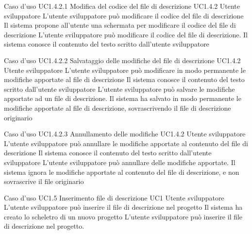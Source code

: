 \UCtitle
{Caso d'uso UC1.4.2.1}
{Modifica del codice del file di descrizione}
\UC
{UC1.4.2}
{Utente sviluppatore}
{L'utente sviluppatore può modificare il codice del file di descrizione}
{Il sistema propone all'utente una schermata per modificare il codice del file di descrizione}
\scenario
{L'utente sviluppatore può modificare il codice del file di descrizione.}
\post
{Il sistema conosce il contenuto del testo scritto dall'utente sviluppatore}

\UCtitle
{Caso d'uso UC1.4.2.2}
{Salvataggio delle modifiche del file di descrizione}
\UC
{UC1.4.2}
{Utente sviluppatore}
{L'utente sviluppatore può modificare in modo permanente le modifiche apportate al file di descrizione}
{Il sistema conosce il contenuto del testo scritto dall'utente sviluppatore}
\scenario
{L'utente sviluppatore può salvare le modifiche apportate ad un file di descrizione.}
\post
{Il sistema ha salvato in modo permanente le modifiche apportate al file di descrizione, sovrascrivendo il file di descrizione originario}

\UCtitle
{Caso d'uso UC1.4.2.3}
{Annullamento delle modifiche}
\UC
{UC1.4.2}
{Utente sviluppatore}
{L'utente sviluppatore può annullare le modifiche apportate al contenuto del file di descrizione}
{Il sistema conosce il contenuto del testo scritto dall'utente sviluppatore}
\scenario
{L'utente sviluppatore può annullare delle modifiche apportate.}
\post
{Il sistema ignora le modifiche apportate al contenuto del file di descrizione, e non sovrascrive il file originario}

\UCtitle
{Caso d'uso UC1.5}
{Inserimento file di descrizione}
\UC
{UC1}
{Utente sviluppatore}
{L'utente sviluppatore può inserire il file di descrizione nel progetto}
{Il sistema ha creato lo scheletro di un nuovo progetto}
\scenario
{L'utente sviluppatore può inserire il file di descrizione nel progetto.}


